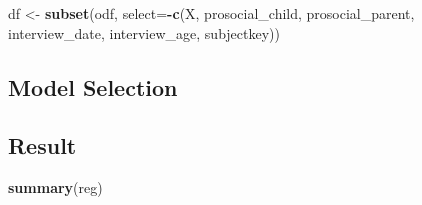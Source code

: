 \documentclass[]{article}
\newenvironment{Shaded}{\begin{snugshade}}{\end{snugshade}}
\newcommand{\DataTypeTok}[1]{\textcolor[rgb]{0.13,0.29,0.53}{#1}}
\newcommand{\KeywordTok}[1]{\textcolor[rgb]{0.13,0.29,0.53}{\textbf{#1}}}
\newcommand{\NormalTok}[1]{#1}
\newcommand{\OperatorTok}[1]{\textcolor[rgb]{0.81,0.36,0.00}{\textbf{#1}}}
\newcommand{\StringTok}[1]{\textcolor[rgb]{0.31,0.60,0.02}{#1}}
\begin{document}
\begin{Shaded}
\begin{Highlighting}[]
\NormalTok{df <-}\StringTok{ }\KeywordTok{subset}\NormalTok{(odf, }\DataTypeTok{select=}\OperatorTok{-}\KeywordTok{c}\NormalTok{(X, prosocial_child, prosocial_parent, interview_date, interview_age, subjectkey))}
\end{Highlighting}
\end{Shaded}

\hypertarget{model-selection}{%
\subsection{Model Selection}\label{model-selection}}

\begin{Shaded}
\end{Shaded}

\hypertarget{result}{%
\subsection{Result}\label{result}}

\begin{Shaded}
\begin{Highlighting}[]
\KeywordTok{summary}\NormalTok{(reg)}
\end{Highlighting}
\end{Shaded}
\end{document}
